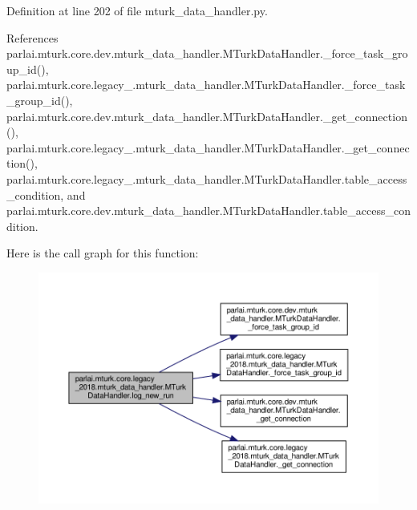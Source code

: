 Definition at line 202 of file mturk\+\_\+data\+\_\+handler.\+py.



References parlai.\+mturk.\+core.\+dev.\+mturk\+\_\+data\+\_\+handler.\+M\+Turk\+Data\+Handler.\+\_\+force\+\_\+task\+\_\+group\+\_\+id(), parlai.\+mturk.\+core.\+legacy\+\_.\+mturk\+\_\+data\+\_\+handler.\+M\+Turk\+Data\+Handler.\+\_\+force\+\_\+task\+\_\+group\+\_\+id(), parlai.\+mturk.\+core.\+dev.\+mturk\+\_\+data\+\_\+handler.\+M\+Turk\+Data\+Handler.\+\_\+get\+\_\+connection(), parlai.\+mturk.\+core.\+legacy\+\_.\+mturk\+\_\+data\+\_\+handler.\+M\+Turk\+Data\+Handler.\+\_\+get\+\_\+connection(), parlai.\+mturk.\+core.\+legacy\+\_.\+mturk\+\_\+data\+\_\+handler.\+M\+Turk\+Data\+Handler.\+table\+\_\+access\+\_\+condition, and parlai.\+mturk.\+core.\+dev.\+mturk\+\_\+data\+\_\+handler.\+M\+Turk\+Data\+Handler.\+table\+\_\+access\+\_\+condition.

Here is the call graph for this function\+:
\nopagebreak
\begin{figure}[H]
\begin{center}
\leavevmode
\includegraphics[width=350pt]{classparlai_1_1mturk_1_1core_1_1legacy__2018_1_1mturk__data__handler_1_1MTurkDataHandler_a0bc9f338e92aa4c1dc7a0f09e743b01e_cgraph}
\end{center}
\end{figure}
\mbox{\label{classparlai_1_1mturk_1_1core_1_1legacy__2018_1_1mturk__data__handler_1_1MTurkDataHandler_a86266f696dc415742c4d1709568a52ff}} 
